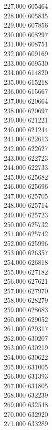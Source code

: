{ 227.000	605464 \\
 228.000	605835 \\
 229.000	607856 \\
 230.000	608297 \\
 231.000	608751 \\
 232.000	609169 \\
 233.000	609530 \\
 234.000	614820 \\
 235.000	615218 \\
 236.000	615667 \\
 237.000	620664 \\
 238.000	620697 \\
 239.000	621221 \\
 240.000	621244 \\
 241.000	622613 \\
 242.000	622627 \\
 243.000	622723 \\
 244.000	622733 \\
 245.000	625682 \\
 246.000	625696 \\
 247.000	625705 \\
 248.000	625714 \\
 249.000	625723 \\
 250.000	625732 \\
 251.000	625742 \\
 252.000	625996 \\
 253.000	626357 \\
 254.000	626818 \\
 255.000	627182 \\
 256.000	627621 \\
 257.000	627970 \\
 258.000	628279 \\
 259.000	628683 \\
 260.000	629052 \\
 261.000	629317 \\
 262.000	630207 \\
 263.000	630219 \\
 264.000	630622 \\
 265.000	631005 \\
 266.000	631393 \\
 267.000	631805 \\
 268.000	632239 \\
 269.000	632548 \\
 270.000	632920 \\
 271.000	633289 \\
}
